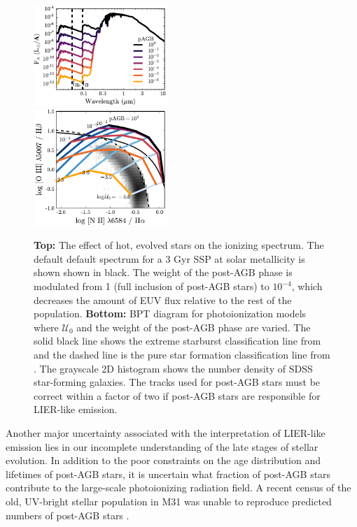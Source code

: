 \documentclass[linenumbers, tighten, trackchanges]{aastex61}%
\newcommand{\U}{\ensuremath{\mathcal{U}_{0}}}
\begin{document}
\begin{figure}[!htbp]
  \begin{centering}
    \includegraphics[width=0.45\textwidth]{f28a.pdf}\\
    \includegraphics[width=0.45\textwidth]{f28b.pdf}
    \caption{\textbf{Top:} The effect of hot, evolved stars on the ionizing spectrum. The default default spectrum for a 3 Gyr SSP at solar metallicity is shown shown in black. The weight of the post-AGB phase is modulated from 1 (full inclusion of post-AGB stars) to $10^{-4}$, which decreases the amount of EUV flux relative to the rest of the population. \textbf{Bottom:} BPT diagram for photoionization models where \U{} and the weight of the post-AGB phase are varied. The solid black line shows the extreme starburst classification line from \citet{Kewley01} and the dashed line is the pure star formation classification line from \citet{Kauffmann03a}. The grayscale 2D histogram shows the number density of SDSS star-forming galaxies. The \citet{Vassiliadis} tracks used for post-AGB stars must be correct within a factor of two if post-AGB stars are responsible for LIER-like emission.}
    \label{fig:hotstars}
  \end{centering}
\end{figure}

Another major uncertainty associated with the interpretation of LIER-like emission lies in our incomplete understanding of the late stages of stellar evolution. In addition to the poor constraints on the age distribution and lifetimes of post-AGB stars, it is uncertain what fraction of post-AGB stars contribute to the large-scale photoionizing radiation field. A recent census of the old, UV-bright stellar population in M31 was unable to reproduce predicted numbers of post-AGB stars \citep{Brown2008}. 
\end{document}
